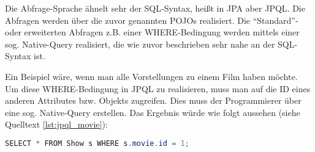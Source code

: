 Die Abfrage-Sprache ähnelt sehr der \acs{SQL}-Syntax, heißt in \ac{JPA} aber \acf{JPQL}.
Die Abfragen werden über die zuvor genannten \acsp{POJO} realisiert.
Die \enquote{Standard}- oder erweiterten Abfragen z.B. einer WHERE-Bedingung werden mittels einer sog. Native-Query realisiert, die wie zuvor beschrieben sehr nahe an der \acs{SQL}-Syntax ist.

Ein Beispiel wäre, wenn man alle Vorstellungen zu einem Film haben möchte.
Um diese WHERE-Bedingung in \acs{JPQL} zu realisieren, muss man auf die ID eines anderen Attributes bzw. Objekts zugreifen.
Dies muss der Programmierer über eine sog. Native-Query erstellen.
Das Ergebnis würde wie folgt aussehen (siehe Quelltext \vref{lst:jpql_movie}): 

\begin{lstlisting}[language=JAVA]
SELECT * FROM Show s WHERE s.movie.id = 1; 
\end{lstlisting}
\label{lst:jpql_movie}